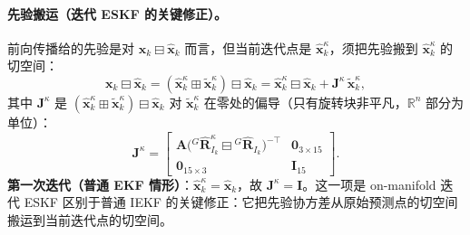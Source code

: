 \paragraph{先验搬运（迭代 ESKF 的关键修正）。}
前向传播给的先验是对 $\mathbf{x}_k\boxminus\hat{\mathbf{x}}_k$ 而言，但当前迭代点是 $\hat{\mathbf{x}}^\kappa_k$，须把先验搬到 $\hat{\mathbf{x}}^\kappa_k$ 的切空间\cite{xu2021fastlio}：
\begin{equation}
  \mathbf{x}_k\boxminus\hat{\mathbf{x}}_k=(\hat{\mathbf{x}}^\kappa_k\boxplus\tilde{\mathbf{x}}^\kappa_k)\boxminus\hat{\mathbf{x}}_k=\hat{\mathbf{x}}^\kappa_k\boxminus\hat{\mathbf{x}}_k+\mathbf{J}^\kappa\,\tilde{\mathbf{x}}^\kappa_k,
  \label{eq:lidar-fl-prior}
\end{equation}
其中 $\mathbf{J}^\kappa$ 是 $(\hat{\mathbf{x}}^\kappa_k\boxplus\tilde{\mathbf{x}}^\kappa_k)\boxminus\hat{\mathbf{x}}_k$ 对 $\tilde{\mathbf{x}}^\kappa_k$ 在零处的偏导（只有旋转块非平凡，$\mathbb{R}^n$ 部分为单位）：
\begin{equation}
  \mathbf{J}^\kappa=\begin{bmatrix}\mathbf{A}\big({}^G\hat{\mathbf{R}}^\kappa_{I_k}\boxminus{}^G\hat{\mathbf{R}}_{I_k}\big)^{-\top} & \mathbf{0}_{3\times15}\\ \mathbf{0}_{15\times3} & \mathbf{I}_{15}\end{bmatrix}.
  \label{eq:lidar-fl-J}
\end{equation}
\textbf{第一次迭代（普通 EKF 情形）}：$\hat{\mathbf{x}}^\kappa_k=\hat{\mathbf{x}}_k$，故 $\mathbf{J}^\kappa=\mathbf{I}$。这一项是 on-manifold 迭代 ESKF 区别于普通 IEKF 的关键修正：它把先验协方差从原始预测点的切空间搬运到当前迭代点的切空间。

